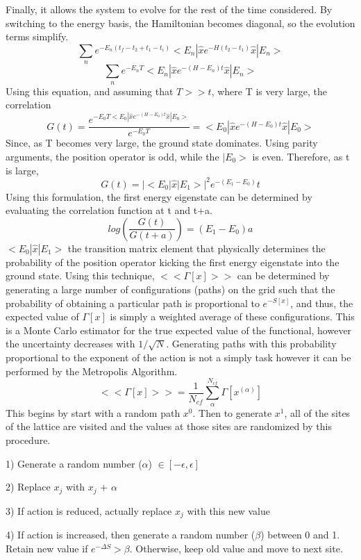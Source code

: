 \documentclass{article}
\begin{document}
Finally, it allows the system to evolve for the rest of the time considered.
By switching to the energy basis, the Hamiltonian becomes diagonal, so the evolution terms simplify.
\begin{equation}
    \sum_n e^{-E_n(t_f - t_2 + t_1 - t_i)} <E_n|\hat{x}e^{-H(t_2 - t_1)}\hat{x}|E_n>
\end{equation}
\begin{equation}
    \sum_n e^{-E_nT} <E_n|\hat{x}e^{-(H - E_n)t}\hat{x}|E_n>
\end{equation}
Using this equation, and assuming that $T >> t$, where T is very large, the correlation
\begin{equation}
    G(t) = \frac{e^{-E_0T<E_0|\hat{x}e^{-(H - E_0)t}\hat{x}|E_0>}}{e^{-E_0T}} = <E_0|\hat{x}e^{-(H - E_0)t}\hat{x}|E_0>
\end{equation}
Since, as T becomes very large, the ground state dominates. Using parity arguments, the position operator is odd, while the $|E_0>$ is even.
Therefore, as t is large, 
\begin{equation}
    G(t) = |<E_0|\hat{x}|E_1>|^2 e^{-(E_1 - E_0)}t
\end{equation}
Using this formulation, the first energy eigenstate can be determined by evaluating the correlation function at t and t+a.
\begin{equation}
    log(\frac{G(t)}{G(t+a)}) = (E_1 - E_0)a
\end{equation}
$<E_0|\hat{x}|E_1>$ the transition matrix element that physically determines the probability of the position operator kicking the first energy eigenstate into the ground state.
Using this technique, $<<\Gamma[x]>>$ can be determined by generating a large number of configurations (paths) on the grid such that the probability
of obtaining a particular path is proportional to $e^{-S[x]}$, and thus, the expected value of $\Gamma[x]$ is simply a weighted average of these configurations.
This is a Monte Carlo estimator for the true expected value of the functional, however the uncertainty decreases with $1/\sqrt{N}$. \newline
Generating paths with this probability proportional to the exponent of the action is not a simply task however it can be performed by the Metropolis Algorithm.
\begin{equation}
    <<\Gamma[x]>> = \frac{1}{N_{cf}} \sum_{\alpha}^{N_{cf}} \Gamma[x^{(\alpha)}]
\end{equation}
This begins by start with a random path $x^0$. Then to generate $x^1$, all of the sites of the lattice are visited and the values at those sites are randomized by this procedure.
\begin{list}{}{}
    \item 1) Generate a random number ($\alpha$) $\in [-\epsilon, \epsilon]$
    \item 2) Replace $x_j$ with $x_j$ + $\alpha$
    \item 3) If action is reduced, actually replace $x_j$ with this new value
    \item 4) If action  is increased, then generate a random number ($\beta$) between 0 and 1. Retain new value if $e^{-\Delta S} > \beta$. Otherwise, keep old value and move to next site.
\end{list}
\end{document}
